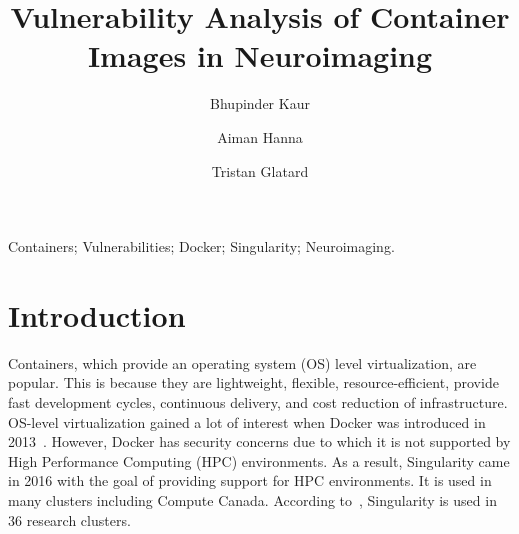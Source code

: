 \documentclass[a4paper,num-refs]{oup-contemporary}
\title{Vulnerability Analysis of Container Images in Neuroimaging}
\begin{document}
\author[1]{Bhupinder Kaur}
\author[1]{Aiman Hanna}
\author[1]{Tristan Glatard}


\maketitle

\begin{keywords}
Containers; Vulnerabilities; Docker; Singularity; Neuroimaging.
\end{keywords}


\section{Introduction}


Containers, which provide an operating system (OS) level virtualization, are
popular. This is because they are lightweight, flexible, resource-efficient,
provide fast development cycles, continuous delivery,
and cost reduction of infrastructure. OS-level virtualization gained a lot of interest when Docker was
introduced in 2013~\cite{gantikow2016providing}. However, Docker has security concerns due to which it
is not supported by High Performance
Computing (HPC) environments. As a result, Singularity came in 2016 with the goal of providing support
for HPC environments. It is used in many clusters including Compute Canada.
According to~\cite{kurtzer2017singularity}, Singularity is used in 36 research clusters.

\end{document}
